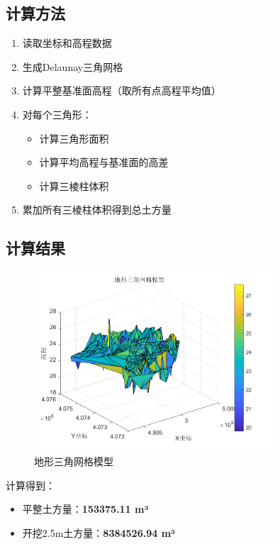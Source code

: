 \documentclass[fontset=windows,openright]{ctexrep}
\begin{document}
\subsection{计算方法}
\begin{enumerate}
    \item 读取坐标和高程数据
    \item 生成Delaunay三角网格
    \item 计算平整基准面高程（取所有点高程平均值）
    \item 对每个三角形：
    \begin{itemize}
        \item 计算三角形面积
        \item 计算平均高程与基准面的高差
        \item 计算三棱柱体积
    \end{itemize}
    \item 累加所有三棱柱体积得到总土方量
\end{enumerate}

\subsection{计算结果}
\begin{figure}[h]
    \centering
    \includegraphics[width=0.8\textwidth]{terrain_model.png}
    \caption{地形三角网格模型}
    \label{fig:terrain}
\end{figure}

计算得到：
\begin{itemize}
    \item 平整土方量：\textbf{153375.11 m³}
    \item 开挖2.5m土方量：\textbf{8384526.94 m³}
\end{itemize}
\end{document}
